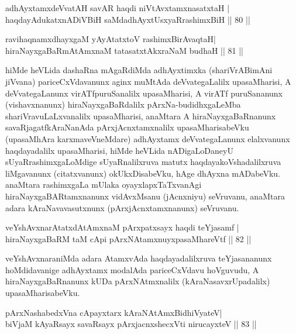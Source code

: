 \begin{shl}
adhAyxtamxdeVvatAH savAR haqdi niVtAvx\s \s tamxnasatxtaH |\\
haqdayAdukatxnADiVBiH saMdadhAyxtUsxyaRrashimxBiH \hfill || 80 || 
\end{shl}

\begin{shl}
ravihaqnamxdhayxgaM yAyAtatxtoV rashimxBirAvaqtaH|\\
hiraNayxgaBaRmAtAmxnaM tatasatxtAkxraNaM budhaH \hfill || 81 || 
\end{shl}

\begin{artha}
hiMde heVLida dashaRna mAgaRdiMda adhAyxtimxka (shariVrABimAni jiVvana) pariceCxVdavanunx aginx muMtAda deVvategaLalilx upasaMharisi, A deVvategaLanunx virATfpuruSanalilx upasaMharisi, A virATf puruSananunx (vishavxnanunx) hiraNayxgaBaRdalilx pArxNa-budidhxgaLeMba shariVravuLaLxvanalilx upasaMharisi, anaMtara A hiraNayxgaBaRnanunx savaRjagatfkAraNanAda pArxjAcnxtamxnalilx upasaMharisabeVku (upasaMhAra karxmaveVneMdare) adhAyxtamx deVvategaLanunx elalxvanunx haqdayadalilx upasaMharisi, hiMde heVLida nADigaLoDaneyU sUyaRrashimxgaLoMdige sUyaRnalilxruva matutx haqdayakoVshadalilxruva liMgavanunx (citatxvanunx) okUkxDisabeVku, hAge dhAyxna mADabeVku. anaMtara rashimxgaLa mUlaka oyayxlapxTaTxvanAgi hiraNayxgaBARtamxnanunx vidAvxMsanu (jAcnxniyu) seVruvanu, anaMtara adara kAraNavavasutxnunx (pArxjAcnxtamxnanunx) seVruvanu.
\end{artha}


\begin{shl}
veYshAvxnarAtatxdAtAmxnaM pArxpatxsayx haqdi teYjasamf |\\
hiraNayxgaBaRM taM cApi pArxNAtamxnuyxpasaMhareVtf \hfill || 82 || 
\end{shl}

\begin{artha}
veYshAvxnaraniMda adara AtamxvAda haqdayadalilxruva teYjasananunx hoMdidavanige adhAyxtamx modalAda pariceCxVdavu hoVguvudu, A hiraNayxgaBaRnanunx kUDa pArxNAtmxnalilx (kAraNasavxrUpadalilx) upasaMharisabeVku.
\end{artha}


\begin{shl}
pArxNashabedxVna cApayxtarx kAraNAtAmx\s BidhiVyateV|\\
biVjaM kAyaRsayx savaRsayx pArxjacnxshecxVti nirucayxteV \hfill || 83 || 
\end{shl}

